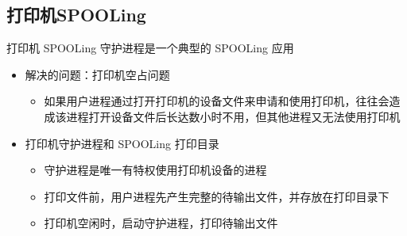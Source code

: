 \documentclass[cs4size,a4paper,10pt]{ctexart}
\begin{document}
		\begin{figure}[H]
			\centering
		\end{figure}

		\subsection{打印机SPOOLing}
		打印机 SPOOLing 守护进程是一个典型的 SPOOLing 应用
		\begin{itemize}
			\item 解决的问题：打印机空占问题
			\begin{itemize}
				\item 如果用户进程通过打开打印机的设备文件来申请和使用打印机，往往会造成该进程打开设备文件后长达数小时不用，但其他进程又无法使用打印机
			\end{itemize}
			\item 打印机守护进程和 SPOOLing 打印目录
			\begin{itemize}
				\item 守护进程是唯一有特权使用打印机设备的进程
				\item 打印文件前，用户进程先产生完整的待输出文件，并存放在打印目录下
				\item 打印机空闲时，启动守护进程，打印待输出文件
			\end{itemize}
		\end{itemize}
\end{document}
